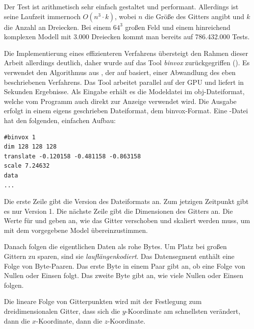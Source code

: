Der Test ist arithmetisch sehr einfach gestaltet und
performant. Allerdings ist seine Laufzeit immernoch $O(n^3 \cdot k)$,
wobei $n$ die Größe des Gitters angibt und $k$ die Anzahl an
Dreiecken. Bei einem $64^3$ großen Feld und einem hinreichend
komplexen Modell mit $3.000$ Dreiecken kommt man bereits auf
786.432.000 Tests.

Die Implementierung eines effizienteren Verfahrens übersteigt den
Rahmen dieser Arbeit allerdings deutlich, daher wurde auf das Tool
\emph{binvox} zurückgegriffen (\cite{binvox2012}). Es verwendet den
Algorithmus aus \cite{Nooruddin2003}, der auf  basiert, einer Abwandlung des eben beschriebenen
Verfahrens. Das Tool arbeitet parallel auf der GPU und liefert in
Sekunden Ergebnisse. Als Eingabe erhält es die Modeldatei im
obj-Dateiformat, welche vom Programm auch direkt zur Anzeige verwendet
wird. Die Ausgabe erfolgt in einem eigens geschrieben Dateiformat, dem
binvox-Format\cite{binvoxfileformat2012}. Eine
-Datei hat den folgenden, einfachen Aufbau:

\begin{verbatim}
#binvox 1
dim 128 128 128
translate -0.120158 -0.481158 -0.863158
scale 7.24632
data
...
\end{verbatim}

Die erste Zeile gibt die Version des Dateiformats an. Zum jetzigen
Zeitpunkt gibt es nur Version 1. Die nächste Zeile gibt die
Dimensionen des Gitters an. Die Werte für
 und  geben an,
wie das Gitter verschoben und skaliert werden muss, um mit dem
vorgegebene Model übereinzustimmen.

Danach folgen die eigentlichen Daten als rohe Bytes. Um Platz bei
großen Gittern zu sparen, sind sie \emph{lauflängenkodiert}. Das
Datensegment enthält eine Folge von Byte-Paaren. Das erste Byte in
einem Paar gibt an, ob eine Folge von Nullen oder Einsen folgt. Das
zweite Byte gibt an, wie viele Nullen oder Einsen folgen.

Die lineare Folge von Gitterpunkten wird mit der Festlegung zum
dreidimensionalen Gitter, dass sich die $y$-Koordinate am schnellsten
verändert, dann die $x$-Koordinate, dann die $z$-Koordinate.

